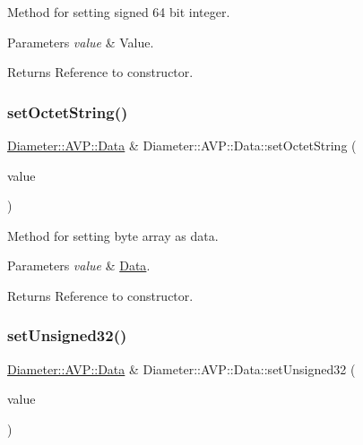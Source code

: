 Method for setting signed 64 bit integer. 


\begin{DoxyParams}{Parameters}
{\em value} & Value. \\
\hline
\end{DoxyParams}
\begin{DoxyReturn}{Returns}
Reference to constructor. 
\end{DoxyReturn}
\mbox{\label{classDiameter_1_1AVP_1_1Data_a12bbc6bbced56e8151e34e7b49963963}} 
\subsubsection{\texorpdfstring{set\+Octet\+String()}{setOctetString()}}
{\footnotesize\ttfamily \hyperlink{classDiameter_1_1AVP_1_1Data}{Diameter\+::\+A\+V\+P\+::\+Data} \& Diameter\+::\+A\+V\+P\+::\+Data\+::set\+Octet\+String (\begin{DoxyParamCaption}\item[{const Byte\+Array \&}]{value }\end{DoxyParamCaption})}



Method for setting byte array as data. 


\begin{DoxyParams}{Parameters}
{\em value} & \hyperlink{classDiameter_1_1AVP_1_1Data}{Data}. \\
\hline
\end{DoxyParams}
\begin{DoxyReturn}{Returns}
Reference to constructor. 
\end{DoxyReturn}
\mbox{\label{classDiameter_1_1AVP_1_1Data_ab0596395222f790540d68b9fcacf868b}} 
\subsubsection{\texorpdfstring{set\+Unsigned32()}{setUnsigned32()}}
{\footnotesize\ttfamily \hyperlink{classDiameter_1_1AVP_1_1Data}{Diameter\+::\+A\+V\+P\+::\+Data} \& Diameter\+::\+A\+V\+P\+::\+Data\+::set\+Unsigned32 (\begin{DoxyParamCaption}\item[{uint32\+\_\+t}]{value }\end{DoxyParamCaption})}



